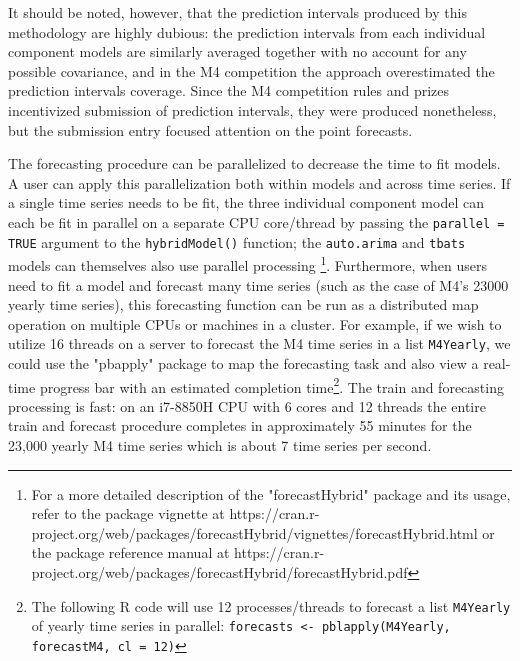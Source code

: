 \documentclass[11pt,3p,review,authoryear]{elsarticle}
\begin{document}
It should be noted, however, that the prediction intervals produced by this methodology are highly dubious: the prediction intervals from each individual component models are similarly averaged together with no account for any possible covariance, and in the M4 competition the approach overestimated the prediction intervals coverage. Since the M4 competition rules and prizes incentivized submission of prediction intervals, they were produced nonetheless, but the submission entry focused attention on the point forecasts.


The forecasting procedure can be parallelized to decrease the time to fit models. A user can apply this parallelization both within models and across time series. If a single time series needs to be fit, the three individual component model can each be fit in parallel on a separate CPU core/thread by passing the \texttt{parallel = TRUE} argument to the \texttt{hybridModel()} function; the \texttt{auto.arima} and \texttt{tbats} models can themselves also use parallel processing \footnote{For a more detailed description of the "forecastHybrid" package and its usage, refer to the package vignette at https://cran.r-project.org/web/packages/forecastHybrid/vignettes/forecastHybrid.html or the package reference manual at https://cran.r-project.org/web/packages/forecastHybrid/forecastHybrid.pdf}. Furthermore, when users need to fit a model and forecast many time series (such as the case of M4's 23000 yearly time series), this forecasting function can be run as a distributed map operation on multiple CPUs or machines in a cluster. For example, if we wish to utilize 16 threads on a server to forecast the M4 time series in a list \texttt{M4Yearly}, we could use the "pbapply" package \citep{pbapply} to map the forecasting task and also view a real-time progress bar with an estimated completion time\footnote{The following R code will use 12 processes/threads to forecast a list \texttt{M4Yearly} of yearly time series in parallel: \texttt{forecasts <- pblapply(M4Yearly, forecastM4, cl = 12)}}. The train and forecasting processing is fast: on an i7-8850H CPU with 6 cores and 12 threads the entire train and forecast procedure completes in approximately 55 minutes for the 23,000 yearly M4 time series which is about 7 time series per second.
\end{document}
